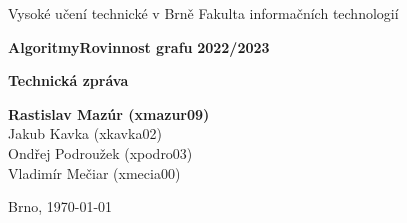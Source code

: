 \documentclass[12pt,a4paper]{article}
\begin{document}
    \pagestyle{empty}
    \begin{titlepage}
        \begin{center}
            \normalsize{Vysoké učení technické v Brně\linebreak}
            \normalsize{Fakulta informačních technologií}

            \vfill

            \large\textbf{Algoritmy\linebreak Rovinnost grafu}
            \large\textbf{2022/2023}

            \vfill

            \LARGE\textbf{Technická zpráva\linebreak}

            \vfill
            \vfill
            \vfill


            \begin{flushleft}
                \large
                \textbf{Rastislav Mazúr  (xmazur09)}\\
                Jakub Kavka (xkavka02)\\
                Ondřej Podroužek (xpodro03)\\
                Vladimír Mečiar (xmecia00)\\
                \hfill

                Brno, \today
            \end{flushleft}
        \end{center}
    \end{titlepage}
    \pagestyle{plain}
    \newpage

    \tableofcontents
    \newpage


    
    
    
    
    
    
    
\end{document}
